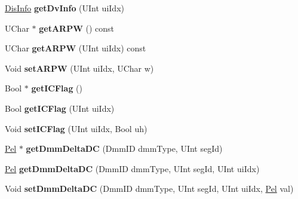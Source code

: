 \begin{DoxyCompactItemize}
\hyperlink{struct___dis_cand}{Dis\+Info} {\bfseries get\+Dv\+Info} (U\+Int ui\+Idx)
\item 
\mbox{\label{class_t_com_data_c_u_afd451409caa57c66ae5039f4fb681f78}} 
U\+Char $\ast$ {\bfseries get\+A\+R\+PW} () const
\item 
\mbox{\label{class_t_com_data_c_u_a1d06832fba623b5ff05f4935c6516188}} 
U\+Char {\bfseries get\+A\+R\+PW} (U\+Int ui\+Idx) const
\item 
\mbox{\label{class_t_com_data_c_u_a640ef10a67d66ccb8f44b03dcdffa2af}} 
Void {\bfseries set\+A\+R\+PW} (U\+Int ui\+Idx, U\+Char w)
\item 
\mbox{\label{class_t_com_data_c_u_ab2f579298df644359cd131c578573114}} 
Bool $\ast$ {\bfseries get\+I\+C\+Flag} ()
\item 
\mbox{\label{class_t_com_data_c_u_a30dfa8722fe0f604041b13c0bf2371b9}} 
Bool {\bfseries get\+I\+C\+Flag} (U\+Int ui\+Idx)
\item 
\mbox{\label{class_t_com_data_c_u_a8d6e58003f0e5ea1feb045b178d35601}} 
Void {\bfseries set\+I\+C\+Flag} (U\+Int ui\+Idx, Bool uh)
\item 
\mbox{\label{class_t_com_data_c_u_a29a1fadac9360229522673afaf30ca32}} 
\hyperlink{_type_def_8h_af92141699657699b4b547be0c8517541}{Pel} $\ast$ {\bfseries get\+Dmm\+Delta\+DC} (Dmm\+ID dmm\+Type, U\+Int seg\+Id)
\item 
\mbox{\label{class_t_com_data_c_u_ad0b016c66395cb656f9024d2e0727397}} 
\hyperlink{_type_def_8h_af92141699657699b4b547be0c8517541}{Pel} {\bfseries get\+Dmm\+Delta\+DC} (Dmm\+ID dmm\+Type, U\+Int seg\+Id, U\+Int ui\+Idx)
\item 
\mbox{\label{class_t_com_data_c_u_a610a237e7690eed108e99afada0434ef}} 
Void {\bfseries set\+Dmm\+Delta\+DC} (Dmm\+ID dmm\+Type, U\+Int seg\+Id, U\+Int ui\+Idx, \hyperlink{_type_def_8h_af92141699657699b4b547be0c8517541}{Pel} val)
\item 
\mbox{\label{class_t_com_data_c_u_a4cbc1a6f8c29e5b895e6483a8a5fbbb1}} 

\end{DoxyCompactItemize}
